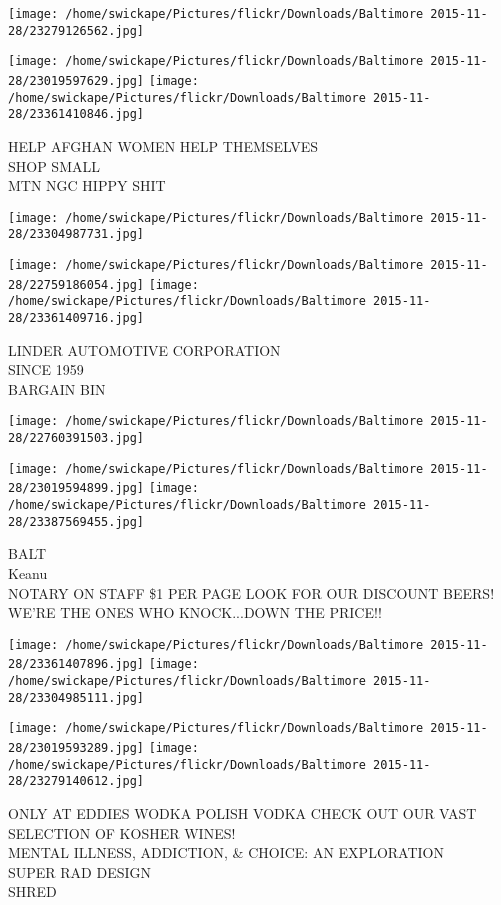 \documentclass[10pt,letterpaper]{article}
\begin{document}
\texttt{[image: /home/swickape/Pictures/flickr/Downloads/Baltimore 2015-11-28/23279126562.jpg]}

\vspace{0.25in}
\texttt{[image: /home/swickape/Pictures/flickr/Downloads/Baltimore 2015-11-28/23019597629.jpg]}
\texttt{[image: /home/swickape/Pictures/flickr/Downloads/Baltimore 2015-11-28/23361410846.jpg]}

HELP AFGHAN WOMEN HELP THEMSELVES\\
SHOP SMALL\\
MTN NGC HIPPY SHIT
\pagebreak

\texttt{[image: /home/swickape/Pictures/flickr/Downloads/Baltimore 2015-11-28/23304987731.jpg]}

\vspace{0.25in}
\texttt{[image: /home/swickape/Pictures/flickr/Downloads/Baltimore 2015-11-28/22759186054.jpg]}
\texttt{[image: /home/swickape/Pictures/flickr/Downloads/Baltimore 2015-11-28/23361409716.jpg]}

LINDER AUTOMOTIVE CORPORATION\\
SINCE 1959\\
BARGAIN BIN
\pagebreak

\texttt{[image: /home/swickape/Pictures/flickr/Downloads/Baltimore 2015-11-28/22760391503.jpg]}

\vspace{0.25in}
\texttt{[image: /home/swickape/Pictures/flickr/Downloads/Baltimore 2015-11-28/23019594899.jpg]}
\texttt{[image: /home/swickape/Pictures/flickr/Downloads/Baltimore 2015-11-28/23387569455.jpg]}

BALT\\
Keanu\\
NOTARY ON STAFF \$1 PER PAGE LOOK FOR OUR DISCOUNT BEERS!  WE'RE THE ONES WHO KNOCK...DOWN THE PRICE!!
\pagebreak

\texttt{[image: /home/swickape/Pictures/flickr/Downloads/Baltimore 2015-11-28/23361407896.jpg]}
\texttt{[image: /home/swickape/Pictures/flickr/Downloads/Baltimore 2015-11-28/23304985111.jpg]}

\texttt{[image: /home/swickape/Pictures/flickr/Downloads/Baltimore 2015-11-28/23019593289.jpg]}
\texttt{[image: /home/swickape/Pictures/flickr/Downloads/Baltimore 2015-11-28/23279140612.jpg]}

ONLY AT EDDIES WODKA POLISH VODKA CHECK OUT OUR VAST SELECTION OF KOSHER WINES!\\
MENTAL ILLNESS, ADDICTION, \& CHOICE: AN EXPLORATION\\
SUPER RAD DESIGN\\
SHRED
\pagebreak
\end{document}
